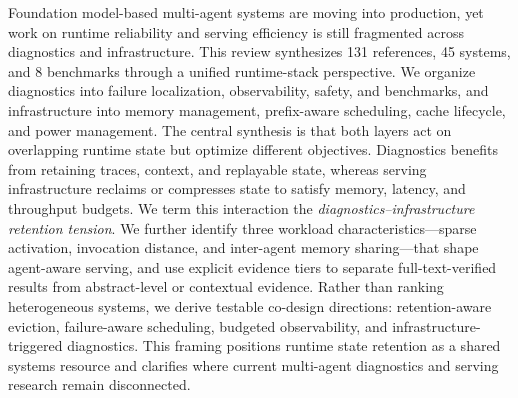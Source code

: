 Foundation model-based multi-agent systems are moving into production, yet work on runtime reliability and serving efficiency is still fragmented across diagnostics and infrastructure. This review synthesizes 131 references, 45 systems, and 8 benchmarks through a unified runtime-stack perspective. We organize diagnostics into failure localization, observability, safety, and benchmarks, and infrastructure into memory management, prefix-aware scheduling, cache lifecycle, and power management. The central synthesis is that both layers act on overlapping runtime state but optimize different objectives. Diagnostics benefits from retaining traces, context, and replayable state, whereas serving infrastructure reclaims or compresses state to satisfy memory, latency, and throughput budgets. We term this interaction the \emph{diagnostics--infrastructure retention tension}. We further identify three workload characteristics---sparse activation, invocation distance, and inter-agent memory sharing---that shape agent-aware serving, and use explicit evidence tiers to separate full-text-verified results from abstract-level or contextual evidence. Rather than ranking heterogeneous systems, we derive testable co-design directions: retention-aware eviction, failure-aware scheduling, budgeted observability, and infrastructure-triggered diagnostics. This framing positions runtime state retention as a shared systems resource and clarifies where current multi-agent diagnostics and serving research remain disconnected.
